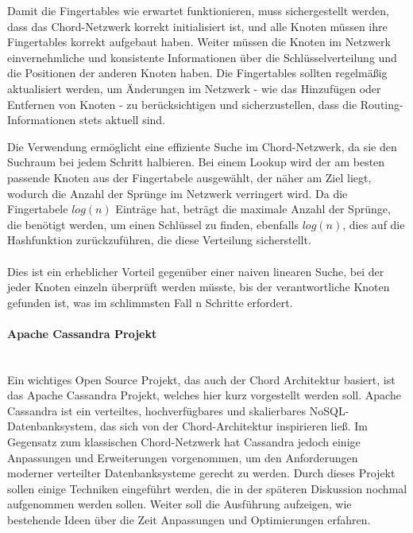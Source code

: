 Damit die Fingertables wie erwartet funktionieren, muss sichergestellt werden, dass das Chord-Netzwerk  korrekt initialisiert ist, und alle Knoten müssen ihre Fingertables korrekt aufgebaut haben. Weiter müssen die Knoten im Netzwerk einvernehmliche und konsistente Informationen über die Schlüsselverteilung und die Positionen der anderen Knoten haben. Die Fingertables sollten regelmäßig aktualisiert werden, um Änderungen im Netzwerk - wie das Hinzufügen oder Entfernen von Knoten - zu berücksichtigen und sicherzustellen, dass die Routing-Informationen stets aktuell sind.

Die Verwendung ermöglicht eine effiziente Suche im Chord-Netzwerk, da sie den Suchraum bei jedem Schritt halbieren. Bei einem Lookup wird der am besten passende Knoten aus der Fingertabele ausgewählt, der näher am Ziel liegt, wodurch die Anzahl der Sprünge im Netzwerk verringert wird. Da die Fingertabele $log(n)$ Einträge hat, beträgt die maximale Anzahl der Sprünge, die benötigt werden, um einen Schlüssel zu finden, ebenfalls $log(n)$, dies auf die Hashfunktion zurückzuführen, die diese Verteilung sicherstellt. 
\\\\
Dies ist ein erheblicher Vorteil gegenüber einer naiven linearen Suche, bei der jeder Knoten einzeln überprüft werden müsste, bis der verantwortliche Knoten gefunden ist, was im schlimmsten Fall n Schritte erfordert.

\paragraph{Apache Cassandra Projekt\\\\}
Ein wichtiges Open Source Projekt, das auch der Chord Architektur basiert, ist das Apache Cassandra Projekt, welches hier kurz vorgestellt werden soll. Apache Cassandra ist ein verteiltes, hochverfügbares und skalierbares NoSQL-Datenbanksystem, das sich von der Chord-Architektur inspirieren ließ. Im Gegensatz zum klassischen Chord-Netzwerk hat Cassandra jedoch einige Anpassungen und Erweiterungen vorgenommen, um den Anforderungen moderner verteilter Datenbanksysteme gerecht zu werden. Durch dieses Projekt sollen einige Techniken eingeführt werden, die in der späteren Diskussion nochmal aufgenommen werden sollen. Weiter soll die Ausführung aufzeigen, wie bestehende Ideen über die Zeit Anpassungen und Optimierungen erfahren.

